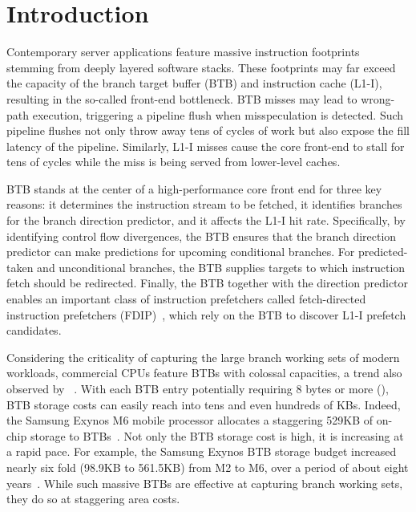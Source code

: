 \section{Introduction}
\label{sec:intro}

Contemporary server applications feature massive instruction footprints stemming from deeply layered software stacks. These footprints may far exceed the capacity of the branch target buffer (BTB) and instruction cache (L1-I), resulting in the so-called front-end bottleneck. BTB misses may lead to wrong-path execution, triggering a pipeline flush when misspeculation is detected. Such pipeline flushes not only throw away tens of cycles of work but also expose the fill latency of the pipeline. Similarly, L1-I misses cause the core front-end to stall for tens of cycles while the miss is being served from lower-level caches. 

BTB stands at the center of a high-performance core front end for three key reasons: it determines the instruction stream to be fetched, it identifies branches for the branch direction predictor, and it affects the L1-I hit rate. Specifically, by identifying control flow divergences, the BTB ensures that the branch direction predictor can make predictions for upcoming conditional branches. For predicted-taken and unconditional branches, the BTB supplies targets to which instruction fetch should be redirected. Finally, the BTB together with the direction predictor enables an important class of instruction prefetchers called fetch-directed instruction prefetchers (FDIP)~\cite{fdip, boomerang, shotgun, shotgunTOCS}, which rely on the BTB to discover L1-I prefetch candidates. 

Considering the criticality of capturing the large branch working sets of modern workloads, commercial CPUs feature BTBs with colossal capacities, a trend also observed by ~\cite{rebase}. With each BTB entry potentially requiring 8 bytes or more (), BTB storage costs can easily reach into tens and even hundreds of KBs. Indeed, the Samsung Exynos M6 mobile processor allocates a staggering 529KB of on-chip storage to BTBs~\cite{exynos}. Not only the BTB storage cost is high, it is increasing at a rapid pace. For example, the Samsung Exynos BTB storage budget increased nearly six fold (98.9KB to 561.5KB) from M2 to M6, over a period of about eight years~\cite{exynos}. While such massive BTBs are effective at capturing branch working sets, they do so at staggering area costs.

